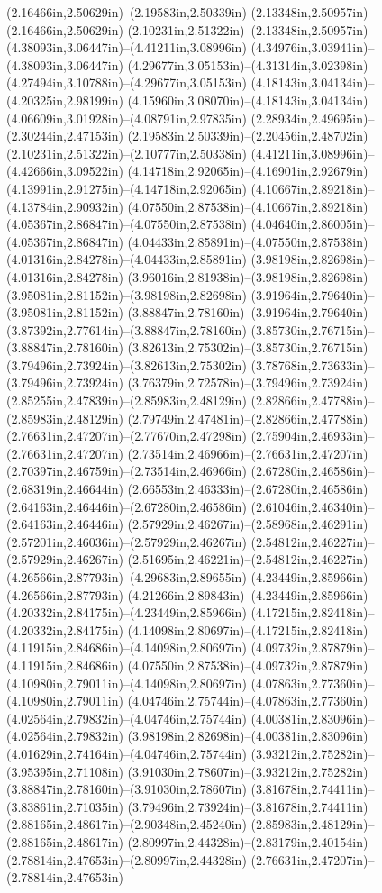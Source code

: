 (2.16466in,2.50629in)--(2.19583in,2.50339in) (2.13348in,2.50957in)--(2.16466in,2.50629in) (2.10231in,2.51322in)--(2.13348in,2.50957in) (4.38093in,3.06447in)--(4.41211in,3.08996in) (4.34976in,3.03941in)--(4.38093in,3.06447in) (4.29677in,3.05153in)--(4.31314in,3.02398in) (4.27494in,3.10788in)--(4.29677in,3.05153in) (4.18143in,3.04134in)--(4.20325in,2.98199in) (4.15960in,3.08070in)--(4.18143in,3.04134in) (4.06609in,3.01928in)--(4.08791in,2.97835in) (2.28934in,2.49695in)--(2.30244in,2.47153in) (2.19583in,2.50339in)--(2.20456in,2.48702in) (2.10231in,2.51322in)--(2.10777in,2.50338in) (4.41211in,3.08996in)--(4.42666in,3.09522in) (4.14718in,2.92065in)--(4.16901in,2.92679in) (4.13991in,2.91275in)--(4.14718in,2.92065in) (4.10667in,2.89218in)--(4.13784in,2.90932in) (4.07550in,2.87538in)--(4.10667in,2.89218in) (4.05367in,2.86847in)--(4.07550in,2.87538in) (4.04640in,2.86005in)--(4.05367in,2.86847in) (4.04433in,2.85891in)--(4.07550in,2.87538in) (4.01316in,2.84278in)--(4.04433in,2.85891in) (3.98198in,2.82698in)--(4.01316in,2.84278in) (3.96016in,2.81938in)--(3.98198in,2.82698in) (3.95081in,2.81152in)--(3.98198in,2.82698in) (3.91964in,2.79640in)--(3.95081in,2.81152in) (3.88847in,2.78160in)--(3.91964in,2.79640in) (3.87392in,2.77614in)--(3.88847in,2.78160in) (3.85730in,2.76715in)--(3.88847in,2.78160in) (3.82613in,2.75302in)--(3.85730in,2.76715in) (3.79496in,2.73924in)--(3.82613in,2.75302in) (3.78768in,2.73633in)--(3.79496in,2.73924in) (3.76379in,2.72578in)--(3.79496in,2.73924in) (2.85255in,2.47839in)--(2.85983in,2.48129in) (2.82866in,2.47788in)--(2.85983in,2.48129in) (2.79749in,2.47481in)--(2.82866in,2.47788in) (2.76631in,2.47207in)--(2.77670in,2.47298in) (2.75904in,2.46933in)--(2.76631in,2.47207in) (2.73514in,2.46966in)--(2.76631in,2.47207in) (2.70397in,2.46759in)--(2.73514in,2.46966in) (2.67280in,2.46586in)--(2.68319in,2.46644in) (2.66553in,2.46333in)--(2.67280in,2.46586in) (2.64163in,2.46446in)--(2.67280in,2.46586in) (2.61046in,2.46340in)--(2.64163in,2.46446in) (2.57929in,2.46267in)--(2.58968in,2.46291in) (2.57201in,2.46036in)--(2.57929in,2.46267in) (2.54812in,2.46227in)--(2.57929in,2.46267in) (2.51695in,2.46221in)--(2.54812in,2.46227in) (4.26566in,2.87793in)--(4.29683in,2.89655in) (4.23449in,2.85966in)--(4.26566in,2.87793in) (4.21266in,2.89843in)--(4.23449in,2.85966in) (4.20332in,2.84175in)--(4.23449in,2.85966in) (4.17215in,2.82418in)--(4.20332in,2.84175in) (4.14098in,2.80697in)--(4.17215in,2.82418in) (4.11915in,2.84686in)--(4.14098in,2.80697in) (4.09732in,2.87879in)--(4.11915in,2.84686in) (4.07550in,2.87538in)--(4.09732in,2.87879in) (4.10980in,2.79011in)--(4.14098in,2.80697in) (4.07863in,2.77360in)--(4.10980in,2.79011in) (4.04746in,2.75744in)--(4.07863in,2.77360in) (4.02564in,2.79832in)--(4.04746in,2.75744in) (4.00381in,2.83096in)--(4.02564in,2.79832in) (3.98198in,2.82698in)--(4.00381in,2.83096in) (4.01629in,2.74164in)--(4.04746in,2.75744in) (3.93212in,2.75282in)--(3.95395in,2.71108in) (3.91030in,2.78607in)--(3.93212in,2.75282in) (3.88847in,2.78160in)--(3.91030in,2.78607in) (3.81678in,2.74411in)--(3.83861in,2.71035in) (3.79496in,2.73924in)--(3.81678in,2.74411in) (2.88165in,2.48617in)--(2.90348in,2.45240in) (2.85983in,2.48129in)--(2.88165in,2.48617in) (2.80997in,2.44328in)--(2.83179in,2.40154in) (2.78814in,2.47653in)--(2.80997in,2.44328in) (2.76631in,2.47207in)--(2.78814in,2.47653in) 
